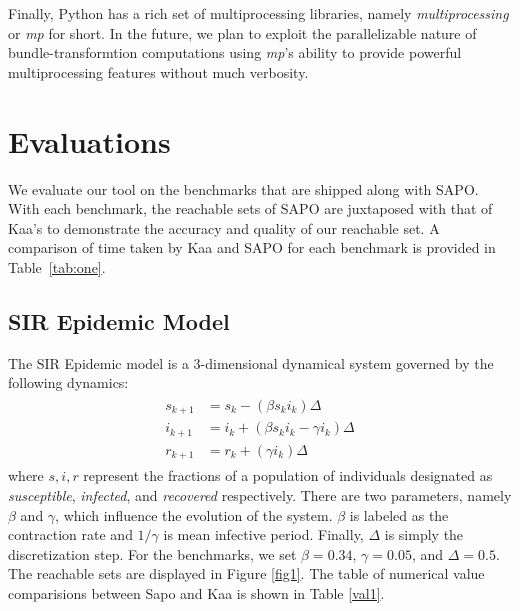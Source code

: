 \documentclass[EPiC]{easychair}
\begin{document}
%
Finally, Python has a rich set of multiprocessing libraries, namely \emph{multiprocessing} or \emph{mp} for short. In the future, we plan to exploit the parallelizable nature of bundle-transformtion computations using \emph{mp}'s ability to provide powerful multiprocessing features without much verbosity.






\section{Evaluations}
We evaluate our tool on the benchmarks that are shipped along with SAPO. With each benchmark, the reachable sets of SAPO are juxtaposed with that of Kaa's to demonstrate the accuracy and quality of our reachable set. A comparison of time taken by Kaa and SAPO for each benchmark is provided in Table~\ref{tab:one}.

\subsection{SIR Epidemic Model}
\noindent The SIR Epidemic model is a 3-dimensional dynamical system governed by the following dynamics:
\begin{align} \label{eqn:sir}
    \begin{split}
        s_{k+1} &= s_k - (\beta s_k i_k)\Delta \\
        i_{k+1} &= i_k + (\beta s_k i_k - \gamma i_k)\Delta \\
        r_{k+1} &= r_k + (\gamma i_k)\Delta
    \end{split}
\end{align} 
where $s,i,r$ represent the fractions of a population of individuals designated as \textit{susceptible}, \textit{infected}, and \textit{recovered} respectively. There are two parameters, namely $\beta$ and $\gamma$, which influence the evolution of the system. $\beta$ is labeled as the contraction rate and $1/\gamma$ is mean infective period. Finally, $\Delta$ is simply the discretization step. For the benchmarks, we set $\beta = 0.34$, $\gamma=0.05$, and $\Delta=0.5$. The reachable sets are displayed in Figure \ref{fig1}. The table of numerical value comparisions between Sapo and Kaa is shown in Table \ref{val1}.
\end{document}
